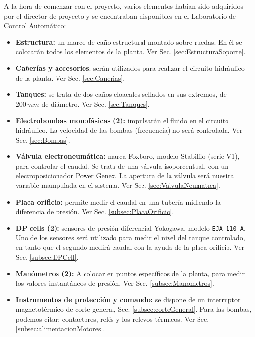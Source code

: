 A la hora de comenzar con el proyecto, varios elementos habían
sido adquiridos por el director de proyecto y se encontraban
disponibles en el Laboratorio de Control Automático:
\begin{itemize}
  \item \textbf{Estructura:} un marco de caño estructural montado sobre
  ruedas. En él se colocarán todos los elementos de la planta.
  Ver Sec. \ref{sec:EstructuraSoporte}.

  \item \textbf{Cañerías y accesorios}: serán utilizados para realizar el
  circuito hidráulico de la planta. Ver Sec. \ref{sec:Canerias}.

  \item \textbf{Tanques:} se trata de dos caños cloacales sellados en sus
  extremos, de $200\,mm$ de diámetro. Ver Sec. \ref{sec:Tanques}.

  \item \textbf{Electrobombas monofásicas (2):} impulsarán el fluido
  en el circuito hidráulico.
  La velocidad de las bombas (frecuencia) no será controlada.
  Ver Sec. \ref{sec:Bombas}.

  \item \textbf{Válvula electroneumática:} marca Foxboro, modelo
  Stabilflo (serie V1), para controlar el caudal.
  Se trata de una válvula isoporcentual, con un electroposicionador
  Power Genex.
  La apertura de la válvula será nuestra variable manipulada en
  el sistema.
  Ver Sec. \ref{sec:ValvulaNeumatica}.

  \item \textbf{Placa orificio:} permite medir el
  caudal en una tubería midiendo la diferencia de presión.
  Ver Sec. \ref{subsec:PlacaOrificio}.

  \item \textbf{DP cells (2):} sensores de presión
  diferencial Yokogawa, modelo \verb|EJA 110 A|.
  Uno de los sensores será utilizado para medir el nivel del tanque controlado,
  en tanto que el segundo medirá caudal con la ayuda de la placa orificio.
  Ver Sec. \ref{subsec:DPCell}.

  \item \textbf{Manómetros (2):} A colocar en
  puntos específicos de la planta, para medir los valores instantáneos de
  presión.
  Ver Sec. \ref{subsec:Manometros}.

  \item \textbf{Instrumentos de protección y comando:}
  se dispone de un interruptor magnetotérmico de corte general,
  Sec. \ref{subsec:corteGeneral}.
  Para las bombas, podemos citar: contactores, relés y los relevos térmicos.
  Ver Sec. \ref{subsec:alimentacionMotores}.


\end{itemize}
